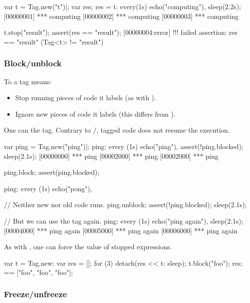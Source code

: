 \begin{urbiscript}[firstnumber=1]
var t = Tag.new("t")|;
var res;
res = t: every(1s) echo("computing"),
sleep(2.2s);
[00000001] *** computing
[00000002] *** computing
[00000003] *** computing

t.stop("result");
assert(res == "result");
[00000004:error] !!! failed assertion: res == "result" (Tag<t> != "result")
\end{urbiscript}


\subsubsection{Block/unblock}
\label{sec:specs:tag:block}

To  a tag means:
\begin{itemize}
\item Stop running pieces of code it labels (as with
  ).
\item Ignore new pieces of code it labels (this differs from
  ).
\end{itemize}

One can  the tag.  Contrary to
/, tagged code does not resume the
execution.

\begin{urbiscript}[firstnumber=1]
var ping = Tag.new("ping")|;
ping:
  every (1s)
    echo("ping"),
assert(!ping.blocked);
sleep(2.1s);
[00000000] *** ping
[00002000] *** ping
[00002000] *** ping

ping.block;
assert(ping.blocked);

ping:
  every (1s)
    echo("pong"),

// Neither new nor old code runs.
ping.unblock;
assert(!ping.blocked);
sleep(2.1s);

// But we can use the tag again.
ping:
  every (1s)
    echo("ping again"),
sleep(2.1s);
[00004000] *** ping again
[00005000] *** ping again
[00006000] *** ping again
\end{urbiscript}

As with , one can force the value of stopped
expressions.

\begin{urbiassert}[firstnumber=1]
{
  var t = Tag.new;
  var res = [];
  for (3)
    detach(res << {t: sleep});
  t.block("foo");
  res;
}
==
["foo", "foo", "foo"];
\end{urbiassert}

\subsubsection{Freeze/unfreeze}
\label{sec:specs:tag:freeze}

